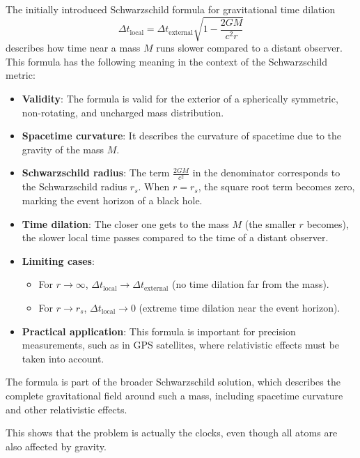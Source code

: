 \documentclass[a4paper,12pt]{article}
\begin{document}
	The initially introduced Schwarzschild formula for gravitational time dilation
	\[
	\Delta t_{\text{local}} = \Delta t_{\text{external}} \sqrt{1 - \frac{2 G M}{c^2 r}}
	\]
	describes how time near a mass \( M \) runs slower compared to a distant observer. This formula has the following meaning in the context of the Schwarzschild metric:
	\begin{itemize}
		\item \textbf{Validity}: The formula is valid for the exterior of a spherically symmetric, non-rotating, and uncharged mass distribution.
		\item \textbf{Spacetime curvature}: It describes the curvature of spacetime due to the gravity of the mass \( M \).
		\item \textbf{Schwarzschild radius}: The term \( \frac{2 G M}{c^2} \) in the denominator corresponds to the Schwarzschild radius \( r_s \). When \( r = r_s \), the square root term becomes zero, marking the event horizon of a black hole.
		\item \textbf{Time dilation}: The closer one gets to the mass \( M \) (the smaller \( r \) becomes), the slower local time passes compared to the time of a distant observer.
		\item \textbf{Limiting cases}:
		\begin{itemize}
			\item For \( r \to \infty \), \( \Delta t_{\text{local}} \to \Delta t_{\text{external}} \) (no time dilation far from the mass).
			\item For \( r \to r_s \), \( \Delta t_{\text{local}} \to 0 \) (extreme time dilation near the event horizon).
		\end{itemize}
		\item \textbf{Practical application}: This formula is important for precision measurements, such as in GPS satellites, where relativistic effects must be taken into account.
	\end{itemize}
	The formula is part of the broader Schwarzschild solution, which describes the complete gravitational field around such a mass, including spacetime curvature and other relativistic effects.
	
	This shows that the problem is actually the clocks, even though all atoms are also affected by gravity.
	
\end{document}
